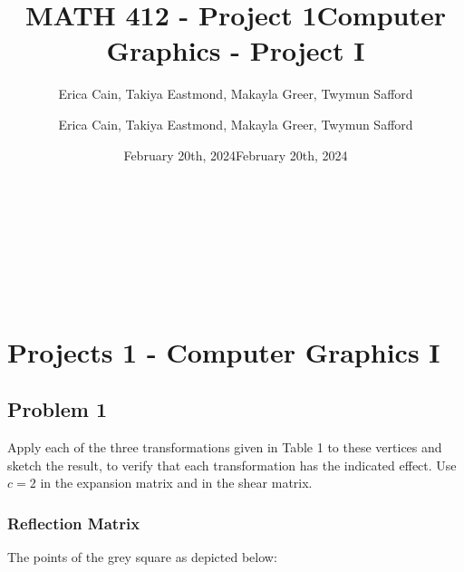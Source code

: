\documentclass{article}
\begin{document}
\title{MATH 412 - Project 1}
\author{Erica Cain, Takiya Eastmond, Makayla Greer, Twymun Safford}
\date{February 20th, 2024}

\begin{titlingpage}
    \begin{center}
        \vspace*{3cm}
        {\Huge \thetitle}\\[0.5cm]
        {\Large \theauthor}\\[2cm]
        {\large \thedate}
    \end{center}
\end{titlingpage}


\fancyfoot[C]{\thepage}

\title{Computer Graphics - Project I}
\author{Erica Cain, Takiya Eastmond, Makayla Greer, Twymun Safford}
\date{February 20th, 2024}

\begin{titlingpage}
    \begin{center}
        \vspace*{3cm}
        {\Huge \thetitle}\\[0.5cm]
        {\Large \theauthor}\\[2cm]
        {\large \thedate}
    \end{center}
\end{titlingpage}

\section*{Projects 1 - Computer Graphics I}

\subsection*{Problem 1}

Apply each of the three transformations given in Table 1 to these vertices and sketch the result, to verify that each transformation has the indicated effect. Use $c=2$ in the expansion matrix and in the shear
matrix.

\subsubsection*{Reflection Matrix}

The points of the grey square as depicted below:
\end{document}
